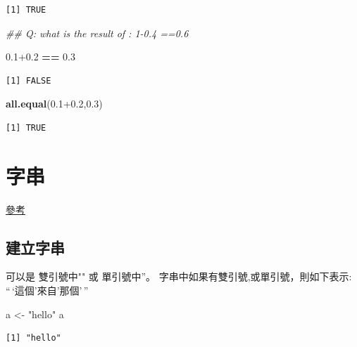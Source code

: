 \documentclass[]{book}
\newenvironment{Shaded}{\begin{snugshade}}{\end{snugshade}}
\newcommand{\CommentTok}[1]{\textcolor[rgb]{0.56,0.35,0.01}{\textit{#1}}}
\newcommand{\FloatTok}[1]{\textcolor[rgb]{0.00,0.00,0.81}{#1}}
\newcommand{\KeywordTok}[1]{\textcolor[rgb]{0.13,0.29,0.53}{\textbf{#1}}}
\newcommand{\NormalTok}[1]{#1}
\newcommand{\OperatorTok}[1]{\textcolor[rgb]{0.81,0.36,0.00}{\textbf{#1}}}
\newcommand{\StringTok}[1]{\textcolor[rgb]{0.31,0.60,0.02}{#1}}
\theoremstyle{definition}
\theoremstyle{definition}
\theoremstyle{definition}
\theoremstyle{remark}
\begin{document}
\begin{verbatim}
[1] TRUE
\end{verbatim}

\begin{Shaded}
\begin{Highlighting}[]
\CommentTok{## Q: what is the result of : 1-0.4 ==0.6}
\end{Highlighting}
\end{Shaded}

\begin{Shaded}
\begin{Highlighting}[]
\FloatTok{0.1+0.2} \OperatorTok{==}\StringTok{ }\FloatTok{0.3}
\end{Highlighting}
\end{Shaded}

\begin{verbatim}
[1] FALSE
\end{verbatim}

\begin{Shaded}
\begin{Highlighting}[]
\KeywordTok{all.equal}\NormalTok{(}\FloatTok{0.1+0.2}\NormalTok{,}\FloatTok{0.3}\NormalTok{)}
\end{Highlighting}
\end{Shaded}

\begin{verbatim}
[1] TRUE
\end{verbatim}

\section{字串}

\href{https://www.gastonsanchez.com/r4strings/chars.html}{參考}

\subsection{建立字串}

可以是 雙引號中"" 或 單引號中''。
字串中如果有雙引號,或單引號，則如下表示:\\
``\,`這個'來自'那個'\,''

\begin{Shaded}
\begin{Highlighting}[]
\NormalTok{a <-}\StringTok{ "hello"}
\NormalTok{a}
\end{Highlighting}
\end{Shaded}

\begin{verbatim}
[1] "hello"
\end{verbatim}
\end{document}
